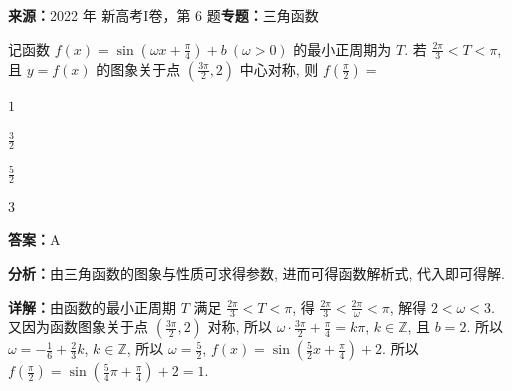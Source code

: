 \begin{question}[points=5]
\textbf{来源：}2022 年 新高考I卷，第 6 题\quad \textbf{专题：}三角函数\par
记函数 $f(x) = \sin\left(\omega x + \frac{\pi}{4}\right) + b\ (\omega > 0)$ 的最小正周期为 $T$. 若 $\frac{2\pi}{3} < T < \pi$, 且 $y = f(x)$ 的图象关于点 $\left(\frac{3\pi}{2}, 2\right)$ 中心对称, 则 $f\left(\frac{\pi}{2}\right) =$
\begin{choices}
  \item $1$
  \item $\frac{3}{2}$
  \item $\frac{5}{2}$
  \item $3$
\end{choices}
\begin{solution}
\textbf{答案：}A

\textbf{分析：}由三角函数的图象与性质可求得参数, 进而可得函数解析式, 代入即可得解.

\textbf{详解：}由函数的最小正周期 $T$ 满足 $\frac{2\pi}{3} < T < \pi$, 得 $\frac{2\pi}{3} < \frac{2\pi}{\omega} < \pi$, 解得 $2 < \omega < 3$. 又因为函数图象关于点 $\left(\frac{3\pi}{2}, 2\right)$ 对称, 所以 $\omega \cdot \frac{3\pi}{2} + \frac{\pi}{4} = k\pi$, $k \in \mathbb{Z}$, 且 $b = 2$. 所以 $\omega = -\frac{1}{6} + \frac{2}{3}k$, $k \in \mathbb{Z}$, 所以 $\omega = \frac{5}{2}$, $f(x) = \sin\left(\frac{5}{2}x + \frac{\pi}{4}\right) + 2$. 所以 $f\left(\frac{\pi}{2}\right) = \sin\left(\frac{5}{4}\pi + \frac{\pi}{4}\right) + 2 = 1$.
\end{solution}
\end{question}

